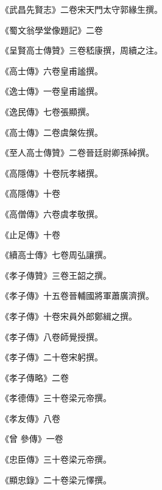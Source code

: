 \begin{pinyinscope}
 《武昌先賢志》二卷宋天門太守郭緣生撰。



 《蜀文翁學堂像題記》二卷



 《呈賢高士傳贊》三卷嵇康撰，周續之注。



 《高士傳》六卷皇甫謐撰。



 《逸士傳》一卷皇甫謐撰。



 《逸民傳》七卷張顯撰。



 《高士傳》二卷虞槃佐撰。



 《至人高士傳贊》二卷晉廷尉卿孫綽撰。



 《高隱傳》十卷阮孝緒撰。



 《高隱傳》十卷



 《高僧傳》六卷虞孝敬撰。



 《止足傳》十卷



 《續高士傳》七卷周弘讓撰。



 《孝子傳贊》三卷王韶之撰。



 《孝子傳》十五卷晉輔國將軍蕭廣濟撰。



 《孝子傳》十卷宋員外郎鄭緝之撰。



 《孝子傳》八卷師覺授撰。



 《孝子傳》二十卷宋躬撰。



 《孝子傳略》二卷



 《孝德傳》三十卷梁元帝撰。



 《孝友傳》八卷



 《曾
 參傳》一卷



 《忠臣傳》三十卷梁元帝撰。



 《顯忠錄》二十卷梁元懌撰。




\end{pinyinscope}
